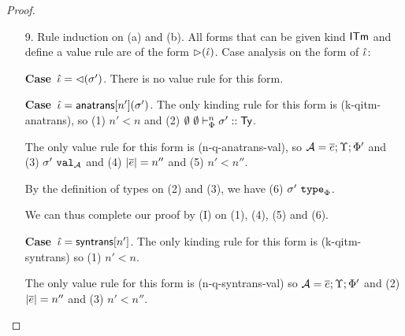 \documentclass[12pt]{article}
\newcommand{\pfcase}[1]{\textbf{Case}~#1. }
\begin{document}
\begin{proof}
\begin{enumerate}
\pfcase{$\qity=\qtuq{\st}$} There is no value rule for this form.

\pfcase{$\qity=\srep{\st'}$} The only kinding rule for this form is (k-qity-trans), so  (1) $\sofkVX{\st'}{\kty}$.

The only value rule for this form is (n-q-tytrans-val), so (2) $\svalA{\st'}$. 

By the definition of types on 1 and 2, we have (3) $\istype{\st'}{\Phi}$. We can thus complete our proof by (I) on (3).

\pfcase{[$\qity$ has form shared with $\tau$]} All kinding rules for these forms are given in Figure \ref{fig:kinding-qity-shared}. For each form, there is one rule. That rule has the property that (1) if $\qity'$ is a direct sub-term of $\qity$, then there is a premise of the form $\sofkVX{\sqity{\qity'}}{\kity}$.

All rules in the static dynamics for these forms are given in Figure \ref{fig:static-dynamics-SL-qity-shared}. For each form, there is one value rule. This rule has the property that (2) if $\qity'$ is a sub-term of $\qity$, the rule has a premise of the form (2) $\svalA{\sqity{\qity'}}$.

We can thus complete our proof by (II) on (1) and (2) in each case.

\item[9.] Rule induction on (a) and (b). All forms that can be given kind ${\sf ITm}$ and define a value rule are of the form ${\rhd}(\hat{\iota})$. Case analysis on the form of $\hat{\iota}$:

\pfcase{$\hat{\iota}={\lhd}(\sigma')$} There is no value rule for this form.

\pfcase{$\hat{\iota}={\sf anatrans}[n'](\sigma')$} The only kinding rule for this form is (k-qitm-anatrans), so (1) $n' < n$ and (2) $\sofkVX{\st'}{\kty}$. 

The only value rule for this form is (n-q-anatrans-val), so $\mathcal{A} = \overline{e};\Upsilon;\Phi'$ and (3) $\svalA{\st'}$ and (4) $|\overline{e}|=n''$ and (5) $n' < n''$.

By the definition of types on (2) and (3), we have (6) $\istype{\st'}{\Phi}$. 

We can thus complete our proof by (I) on (1), (4), (5) and (6).

\pfcase{$\hat{\iota}={\sf syntrans}[n']$} The only kinding rule for this form is (k-qitm-syntrans) so (1) $n' < n$.

The only value rule for this form is (n-q-syntrans-val) so  $\mathcal{A}=\overline{e};\Upsilon;\Phi'$ and (2) $|\overline{e}|=n''$ and (3) $n' < n''$.


\end{enumerate}
\end{proof}
\end{document}
